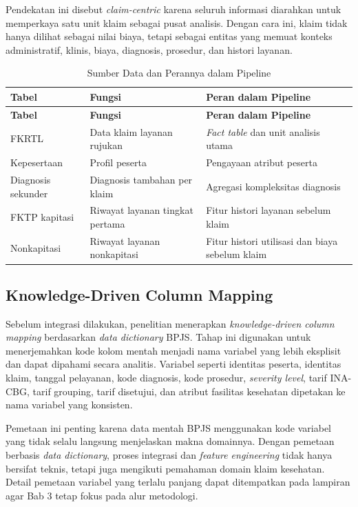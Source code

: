 Pendekatan ini disebut \emph{claim-centric} karena seluruh informasi diarahkan untuk memperkaya satu unit klaim sebagai pusat analisis. Dengan cara ini, klaim tidak hanya dilihat sebagai nilai biaya, tetapi sebagai entitas yang memuat konteks administratif, klinis, biaya, diagnosis, prosedur, dan histori layanan.

\begin{longtable}[]{@{}p{}p{}p{}@{}}
\caption{Sumber Data dan Perannya dalam Pipeline}\label{tab:sumber-data}\\
\toprule
\textbf{Tabel} & \textbf{Fungsi} & \textbf{Peran dalam Pipeline} \\
\midrule
\endfirsthead
\toprule
\textbf{Tabel} & \textbf{Fungsi} & \textbf{Peran dalam Pipeline} \\
\midrule
\endhead
\bottomrule
\endfoot
FKRTL & Data klaim layanan rujukan & \emph{Fact table} dan unit analisis utama \\
Kepesertaan & Profil peserta & Pengayaan atribut peserta \\
Diagnosis sekunder & Diagnosis tambahan per klaim & Agregasi kompleksitas diagnosis \\
FKTP kapitasi & Riwayat layanan tingkat pertama & Fitur histori layanan sebelum klaim \\
Nonkapitasi & Riwayat layanan nonkapitasi & Fitur histori utilisasi dan biaya sebelum klaim \\
\end{longtable}

\subsection{Knowledge-Driven Column Mapping}\label{knowledge-driven-column-mapping}

Sebelum integrasi dilakukan, penelitian menerapkan \emph{knowledge-driven column mapping} berdasarkan \emph{data dictionary} BPJS. Tahap ini digunakan untuk menerjemahkan kode kolom mentah menjadi nama variabel yang lebih eksplisit dan dapat dipahami secara analitis. Variabel seperti identitas peserta, identitas klaim, tanggal pelayanan, kode diagnosis, kode prosedur, \emph{severity level}, tarif INA-CBG, tarif grouping, tarif disetujui, dan atribut fasilitas kesehatan dipetakan ke nama variabel yang konsisten.

Pemetaan ini penting karena data mentah BPJS menggunakan kode variabel yang tidak selalu langsung menjelaskan makna domainnya. Dengan pemetaan berbasis \emph{data dictionary}, proses integrasi dan \emph{feature engineering} tidak hanya bersifat teknis, tetapi juga mengikuti pemahaman domain klaim kesehatan. Detail pemetaan variabel yang terlalu panjang dapat ditempatkan pada lampiran agar Bab 3 tetap fokus pada alur metodologi.

